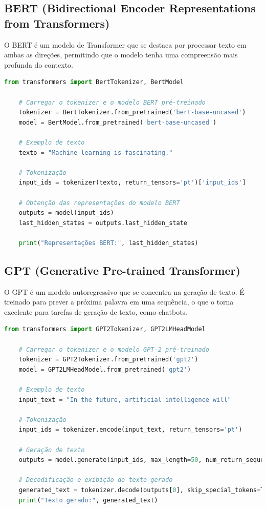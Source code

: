 \documentclass[14pt,a4paper,oneside]{book}
\begin{document}
\subsection{BERT (Bidirectional Encoder Representations from Transformers)}

O BERT é um modelo de Transformer que se destaca por processar texto em ambas as direções, permitindo que o modelo tenha uma compreensão mais profunda do contexto.

\begin{lstlisting}[language=Python]
	from transformers import BertTokenizer, BertModel
	
	# Carregar o tokenizer e o modelo BERT pré-treinado
	tokenizer = BertTokenizer.from_pretrained('bert-base-uncased')
	model = BertModel.from_pretrained('bert-base-uncased')
	
	# Exemplo de texto
	texto = "Machine learning is fascinating."
	
	# Tokenização
	input_ids = tokenizer(texto, return_tensors='pt')['input_ids']
	
	# Obtenção das representações do modelo BERT
	outputs = model(input_ids)
	last_hidden_states = outputs.last_hidden_state
	
	print("Representações BERT:", last_hidden_states)
\end{lstlisting}

\subsection{GPT (Generative Pre-trained Transformer)}

O GPT é um modelo autoregressivo que se concentra na geração de texto. É treinado para prever a próxima palavra em uma sequência, o que o torna excelente para tarefas de geração de texto, como chatbots.

\begin{lstlisting}[language=Python]
	from transformers import GPT2Tokenizer, GPT2LMHeadModel
	
	# Carregar o tokenizer e o modelo GPT-2 pré-treinado
	tokenizer = GPT2Tokenizer.from_pretrained('gpt2')
	model = GPT2LMHeadModel.from_pretrained('gpt2')
	
	# Exemplo de texto
	input_text = "In the future, artificial intelligence will"
	
	# Tokenização
	input_ids = tokenizer.encode(input_text, return_tensors='pt')
	
	# Geração de texto
	outputs = model.generate(input_ids, max_length=50, num_return_sequences=1)
	
	# Decodificação e exibição do texto gerado
	generated_text = tokenizer.decode(outputs[0], skip_special_tokens=True)
	print("Texto gerado:", generated_text)
\end{lstlisting}
\end{document}
